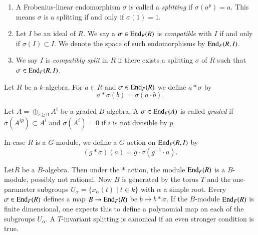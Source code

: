 \begin{definition}\label{chap4-defi4.3.2}
\begin{enumerate}
\item A Frobenius-linear endomorphism $\sigma$ is called a {\em
  splitting} 
if $\sigma(a^{p})=a$. This means $\sigma$ is a splitting
  if and only if $\sigma(1)=1$.

\item Let $I$ be an ideal of $R$. We say a $\sigma\in \operatorname{End}_{F}(R)$ is
{\em compatible} with $I$ if and only if $\sigma(I)\subset I$. We
denote the space of such endomorphisms by $\operatorname{End}_{F}(R,I)$.

\item We say $I$ is {\em compatibly split} 
in $R$ if there exists a
  splitting $\sigma$ of $R$ such that $\sigma\in \operatorname{End}_{F}(R,I)$.
\end{enumerate}
\end{definition}

\begin{definition}\label{chap4-defi4.3.3}
Let $R$ be a $k$-algebra. For $a\in R$ and $\sigma\in \operatorname{End}_{F}(R)$ we
define $a\ast \sigma$ by
$$
a\ast \sigma(b)=\sigma(a\cdot b).
$$
\end{definition}

\begin{definition}\label{chap4-defi4.3.4}
Let $A=\oplus_{i\geq 0}A^{i}$ be a graded $B$-algebra. A
$\sigma\in \operatorname{End}_{F}(A)$ is called {\em graded} if
$\sigma(A^{ip})\subset A^{i}$ and $\sigma(A^{i})=0$ if $i$ is not
divisible by $p$.
\end{definition}

In case $R$ is a $G$-module, we define a $G$ action on $\operatorname{End}_{F}(R,I)$
by
$$
(g\ast\sigma)(a)=g\cdot \sigma(g^{-1}\cdot a).
$$

Let\pageoriginale $R$\label{page40} be a $B$-algebra. Then under the $*$ action, the
module $\operatorname{End}_{F}(R)$ is a $B$-module, possibly not rational. Now $B$
is generated by the torus $T$ and the one-parameter subgroups
$U_{\alpha}=\{x_{\alpha}(t)\mid t\in k\}$ with $\alpha$ a simple
root. Every $\sigma\in \operatorname{End}_{F}(R)$ defines a map $B\to \operatorname{End}_{F}(R)$
be $b\mapsto b\ast \sigma$. If the $B$-module $\operatorname{End}_{F}(R)$ is finite
dimensional, one expects this to define a polynomial map on each of
the subgroups $U_{\alpha}$. A $T$-invariant splitting is canonical if
an even stronger condition is true.

